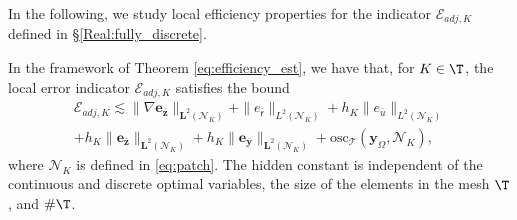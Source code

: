 \documentclass[final]{siamart0216}
\begin{document}
In the following, we study local efficiency properties for the indicator $\mathcal{E}_{adj,K}$ defined in \S\ref{Real:fully_discrete}.

\begin{theorem}\label{eq:efficiency_adj}
In the framework of Theorem \ref{eq:efficiency_est}, we have that, for $K\in\T$, the local error indicator $\mathcal{E}_{adj,K}$ satisfies the bound 
\begin{multline}\label{eq:efficiency_estimates_adj}
\mathcal{E}_{adj,K} \lesssim\|\nabla \mathbf{e}_{\bar{\mathbf{z}}} \|_{\mathbf{L}^2(\mathcal{N}_{K})}+\| e_{\bar{\mathsf{r}}} \|_{L^2(\mathcal{N}_{K})}
+
h_K \|e_{\bar{u}}\|_{L^2(\mathcal{N}_{K})}\\+h_{K}\|\mathbf{e}_{\bar{\mathbf{z}}}\|_{\mathbf{L}^2(\mathcal{N}_{K})}+h_{K}\|\mathbf{e}_{\bar{\mathbf{y}}}\|_{\mathbf{L}^2(\mathcal{N}_{K})}+\mathrm{osc}_{\mathscr{T}}(\mathbf{y}_{\Omega},\mathcal{N}_{K}),
\end{multline}
where $\mathcal{N}_{K}$ is defined in \eqref{eq:patch}. The hidden constant is independent of the continuous and discrete optimal variables, the size of the elements in the mesh $\T$, and $\#\T$.
\end{theorem}
\end{document}
